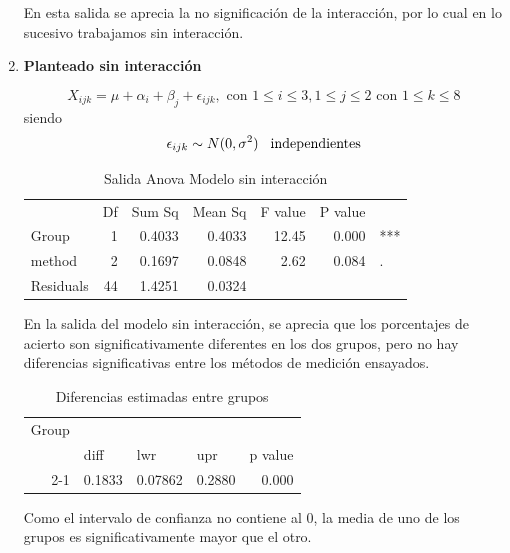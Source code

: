 \documentclass[a4paper,12pt]{article}
\begin{document}
\begin{enumerate}
En esta salida se aprecia la no significación de la interacción, por lo cual en lo sucesivo trabajamos sin interacción.

	\item \textcolor{BlueGreen}{\textbf{Planteado sin interacción}}
	
	\[X_{ijk}=\mu+\alpha_i+\beta_j+\epsilon_{ijk} ,\,\, \text{con} \,\, 1 \leq i \leq 3, 1 \leq j \leq 2 \,\, \text{con} \,\, 1 \leq k \leq 8
	\]
	siendo
	\[
	\epsilon_{ijk}\sim N(0,\sigma^2) \hspace{0.3cm} \text{independientes}
	\]
	
\begin{table}[H]
	\centering
	\caption{Salida Anova Modelo sin interacción}
	\begin{tabular}{lrrrrrr}
		& \multicolumn{1}{l}{Df} & \multicolumn{1}{l}{Sum Sq} & \multicolumn{1}{l}{Mean Sq} & \multicolumn{1}{l}{F value} & \multicolumn{1}{l}{P value} &  \\
		Group & 1     & 0.4033 & 0.4033 & 12.45 & 0.000 & \multicolumn{1}{l}{***} \\
		method & 2     & 0.1697 & 0.0848 & 2.62  & 0.084 & \multicolumn{1}{l}{.} \\
		Residuals & 44    & 1.4251 & 0.0324 &       &       &  \\
	\end{tabular}%
	\label{anova2}%
\end{table}%

En la salida del modelo sin interacción, se aprecia que los porcentajes de acierto son significativamente diferentes en los dos grupos, pero no hay diferencias significativas entre los métodos de medición ensayados.	

	
\begin{table}[H]
	\centering
	\caption{Diferencias estimadas entre grupos }
	\begin{tabular}{rrrrr}
		\multicolumn{1}{l}{Group} &       &       &       &  \\
		& \multicolumn{1}{l}{diff} & \multicolumn{1}{l}{lwr} & \multicolumn{1}{l}{upr} & \multicolumn{1}{l}{p value} \\
		2-1 & 0.1833 & 0.07862 & 0.2880 & 0.000 \\
	\end{tabular}%
	\label{entregrupos}%
\end{table}%

	
	Como el intervalo de confianza no contiene al 0, la media de uno de los grupos es significativamente mayor que el otro.
	

\end{enumerate}
\end{document}
